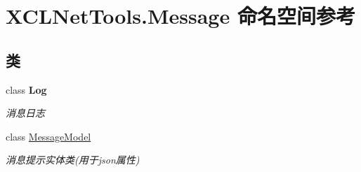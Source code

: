 \hypertarget{namespace_x_c_l_net_tools_1_1_message}{}\section{X\+C\+L\+Net\+Tools.\+Message 命名空间参考}
\label{namespace_x_c_l_net_tools_1_1_message}
\subsection*{类}
\begin{DoxyCompactItemize}
\item 
class {\bfseries Log}
\begin{DoxyCompactList}\small\item\em 消息日志 \end{DoxyCompactList}\item 
class \hyperlink{class_x_c_l_net_tools_1_1_message_1_1_message_model}{Message\+Model}
\begin{DoxyCompactList}\small\item\em 消息提示实体类(用于json属性) \end{DoxyCompactList}\end{DoxyCompactItemize}
